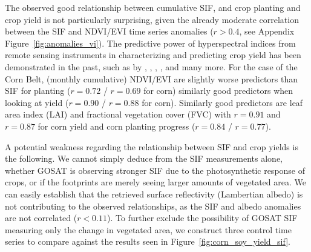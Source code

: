 \documentclass[preprint, a4paper, 10pt, times, 5p]{elsarticle}
\begin{document}
The observed good relationship between cumulative SIF, and crop planting and crop yield is not particularly surprising, given the already moderate correlation between the SIF and NDVI/EVI time series anomalies ($r > 0.4$, see Appendix Figure~\ref{fig:anomalies_vi}). The predictive power of hyperspectral indices from remote sensing instruments in characterizing and predicting crop yield has been demonstrated in the past, such as by \citet{Shanahan2001}, \citet{Prasad2006}, \citet{Beckerreshef2010}, \citet{Mkhabela2011}, \citet{sakamoto2014near} and many more. For the case of the Corn Belt, (monthly cumulative) NDVI/EVI are slightly worse predictors than SIF for planting ($r = 0.72$ / $r = 0.69$ for corn) similarly good predictors when looking at yield ($r = 0.90$ / $r = 0.88$ for corn). Similarly good predictors are leaf area index (LAI) and fractional vegetation cover (FVC) with $r = 0.91$ and $r = 0.87$ for corn yield and corn planting progress ($r = 0.84$ / $r = 0.77$).

A potential weakness regarding the relationship between SIF and crop yields is the following. We cannot simply deduce from the SIF measurements alone, whether GOSAT is observing stronger SIF due to the photosynthetic response of crops, or if the footprints are merely seeing larger amounts of vegetated area. We can easily establish that the retrieved surface reflectivity (Lambertian albedo) is not contributing to the observed relationships, as the SIF and albedo anomalies are not correlated ($r < 0.11$). To further exclude the possibility of GOSAT SIF measuring only the change in vegetated area, we construct three control time series to compare against the results seen in Figure~\ref{fig:corn_soy_yield_sif}.
\end{document}
